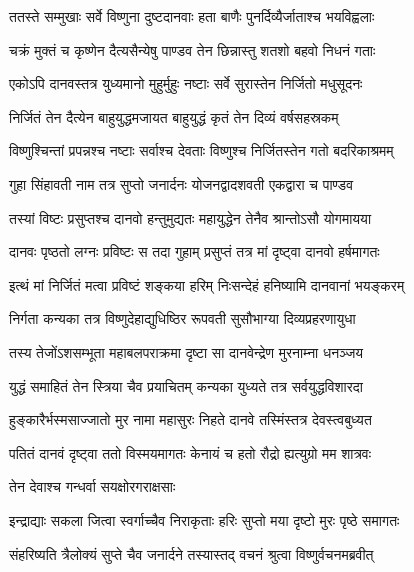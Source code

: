 \twolineshloka
{ततस्ते सम्मुखाः सर्वे विष्णुना दुष्टदानवाः}
{हता बाणैः पुनर्दिव्यैर्जाताश्च भयविह्वलाः}%

\twolineshloka
{चक्रं मुक्तं च कृष्णेन दैत्यसैन्येषु पाण्डव}
{तेन छिन्नास्तु शतशो बहवो निधनं गताः}%

\twolineshloka
{एकोऽपि दानवस्तत्र युध्यमानो मुहुर्मुहुः}
{नष्टाः सर्वे सुरास्तेन निर्जितो मधुसूदनः}%

\twolineshloka
{निर्जितं तेन दैत्येन बाहुयुद्धमजायत}
{बाहुयुद्धं कृतं तेन दिव्यं वर्षसहस्रकम्}%

\twolineshloka
{विष्णुश्चिन्तां प्रपन्नश्च नष्टाः सर्वाश्च देवताः}
{विष्णुश्च निर्जितस्तेन गतो बदरिकाश्रमम्}%

\twolineshloka
{गुहा सिंहावती नाम तत्र सुप्तो जनार्दनः}
{योजनद्वादशवती एकद्वारा च पाण्डव}%

\twolineshloka
{तस्यां विष्टः प्रसुप्तश्च दानवो हन्तुमुद्यतः}
{महायुद्धेन तेनैव श्रान्तोऽसौ योगमायया}%

\twolineshloka
{दानवः पृष्ठतो लग्नः प्रविष्टः स तदा गुहाम्}
{प्रसुप्तं तत्र मां दृष्ट्वा दानवो हर्षमागतः}%

\twolineshloka
{इत्थं मां निर्जितं मत्वा प्रविष्टं शङ्कया हरिम्}
{निःसन्देहं हनिष्यामि दानवानां भयङ्करम्}%

\twolineshloka
{निर्गता कन्यका तत्र विष्णुदेहाद्युधिष्ठिर}
{रूपवती सुसौभाग्या दिव्यप्रहरणायुधा}%

\twolineshloka
{तस्य तेजोंऽशसम्भूता महाबलपराक्रमा}
{दृष्टा सा दानवेन्द्रेण मुरनाम्ना धनञ्जय}%

\twolineshloka
{युद्धं समाहितं तेन स्त्रिया चैव प्रयाचितम्}
{कन्यका युध्यते तत्र सर्वयुद्धविशारदा}%

\twolineshloka
{हुङ्कारैर्भस्मसाज्जातो मुर नामा महासुरः}
{निहते दानवे तस्मिंस्तत्र देवस्त्वबुध्यत}%

\twolineshloka
{पतितं दानवं दृष्ट्वा ततो विस्मयमागतः}
{केनायं च हतो रौद्रो ह्यत्युग्रो मम शात्रवः}%


\onelineshloka
{तेन देवाश्च गन्धर्वा सयक्षोरगराक्षसाः}%

\twolineshloka
{इन्द्राद्याः सकला जित्वा स्वर्गाच्चैव निराकृताः}
{हरिः सुप्तो मया दृष्टो मुरः पृष्ठे समागतः}%

\twolineshloka
{संहरिष्यति त्रैलोक्यं सुप्ते चैव जनार्दने}
{तस्यास्तद् वचनं श्रुत्वा विष्णुर्वचनमब्रवीत्}%

